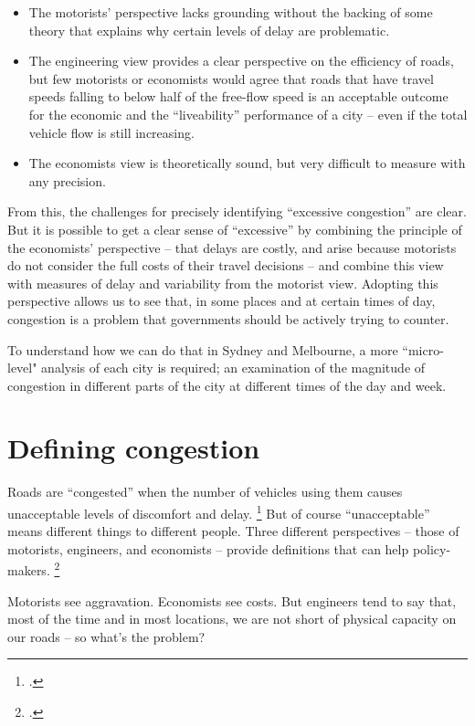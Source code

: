 \begin{itemize}
\item The motorists’ perspective lacks grounding without the backing of some theory that explains why certain levels of delay are problematic. 
\item The engineering view provides a clear perspective on the efficiency of roads, but few motorists or economists would agree that roads that have travel speeds falling to below half of the free-flow speed is an acceptable outcome for the economic and the “liveability” performance of a city – even if the total vehicle flow is still increasing. 
\item The economists view is theoretically sound, but very difficult to measure with any precision. 
\end{itemize}

From this, the challenges for precisely identifying “excessive congestion” are clear. 
But it is possible to get a clear sense of “excessive” by combining the principle of the economists’ perspective – that delays are costly, and arise because motorists do not consider the full costs of their travel decisions – and combine this view with measures of delay and variability from the motorist view. Adopting this perspective allows us to see that, in some places and at certain times of day, congestion is a problem that governments should be actively trying to counter.

To understand how we can do that in Sydney and Melbourne, a more ``micro-level" analysis of each city is required; an examination of the magnitude of congestion in different parts of the city at different times of the day and week.



\appendix
\chapter{Defining congestion}\label{chap:appendix-defining-congestion}

Roads are “congested” when the number of vehicles using them causes unacceptable levels of discomfort and delay.%
    \footcite[][93]{Falcocchio-and-Levinson-congestion-a-concise-guide}
But of course “unacceptable” means different things to different people. Three different perspectives – those of motorists, engineers, and economists -- provide definitions that can help policy-makers.%
    \footcite[][7]{Wallis-Lupton-2013-NZ-Transport-Agency}

Motorists see aggravation.
Economists see costs.
But engineers tend to say that, most of the time and in most locations, we are not short of physical capacity on our roads -- so what's the problem?

